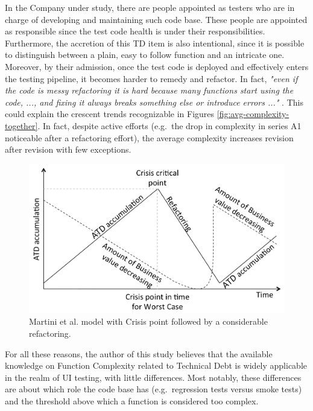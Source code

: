     In the Company under study, there are people appointed as testers who are in charge of developing and maintaining such code base. These people are appointed as responsible since the test code health is under their responsibilities. Furthermore, the accretion of this TD item is also intentional, since it is possible to distinguish between a plain, easy to follow function and an intricate one. Moreover, by their admission, once the test code is deployed and effectively enters the testing pipeline, it becomes harder to remedy and refactor. In fact, \textit{"even if the code is messy refactoring it is hard because many functions start using the code, ..., and fixing it always breaks something else or introduce errors ..." }. This could explain the crescent trends recognizable in Figures \ref{fig:avg-complexity-together}. In fact, despite active efforts (e.g.\ the drop in complexity in series A1 noticeable after a refactoring effort), the average complexity increases revision after revision with few exceptions.

    \begin{figure}[!htbp]
    	\centering
    	\includegraphics[width=\textwidth]{figure/discussion/martini-model.png}
    	\caption{Martini et al. \cite{martini2014architecture} model with Crisis point followed by a considerable refactoring.}
    	\label{fig:antonio-model}
		\end{figure}

    For all these reasons, the author of this study believes that the available knowledge on Function Complexity related to Technical Debt is widely applicable in the realm of UI testing, with little differences. Most notably, these differences are about which role the code base has (e.g.\ regression tests versus smoke tests) and the threshold above which a function is considered too complex.


